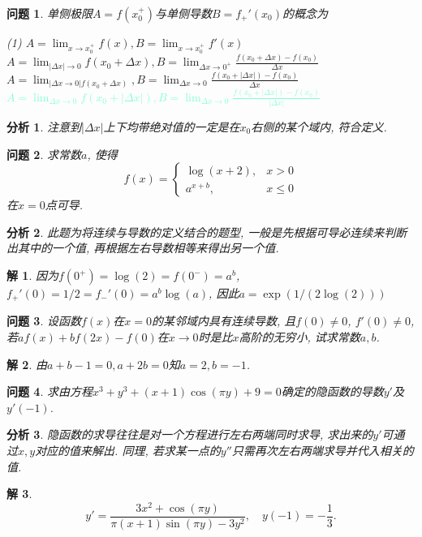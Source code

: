 \documentclass[a4paper, 12pt]{ctexart}
\theoremstyle{plain}
\newtheorem{problem}{问题}
\theoremstyle{nonumberplain}
\newtheorem{solution}{解}
\newtheorem{analysis}{分析}
\newcommand{\ans}[1]{\textcolor{Aquamarine}{#1}}
\newcommand{\lr}[3]{\left#1#3\right#2}
\begin{document}
\begin{problem}
    单侧极限$A=f(x_0^+)$与单侧导数$B=f_+'(x_0)$的概念为
    \begin{tasks}(1)
        \task $A = \lim_{x\to x_0^+}f(x), B = \lim_{x\to x_0^+}f'(x)$
        \task $A = \lim_{\lr\vert\vert{\Delta x}\to 0}f(x_0+\Delta x), B = \lim_{\Delta x\to 0^+}\frac{f(x_0 + \Delta x) - f(x_0)}{\Delta x}$
        \task $A = \lim_{\lr\vert\vert{\Delta x \to 0}f(x_0 + \Delta x)}, B = \lim_{\Delta x \to 0}\frac{f(x_0 + \lr\vert\vert{\Delta x})-f(x_0)}{\Delta x}$
        \task[\ans{(D)}] \ans{$A = \lim_{\Delta x\to 0}f(x_0 + \lr\vert\vert{\Delta x}), B = \lim_{\Delta x \to 0}\frac{f(x_0 + \lr\vert\vert{\Delta x})- f(x_0)}{\lr\vert\vert{\Delta x}}$}
    \end{tasks}
\end{problem}
\begin{analysis}
    注意到$\lr\vert\vert{\Delta x}$上下均带绝对值的一定是在$x_0$右侧的某个域内, 符合定义.
\end{analysis}

\begin{problem}
    求常数$a$, 使得
    \begin{equation}
        f(x) =
        \begin{cases}
            \log(x+2),&x>0\\
            a^{x+b},&x\leq 0
        \end{cases}
    \end{equation}
    在$x=0$点可导.
\end{problem}
\begin{analysis}
    此题为将连续与导数的定义结合的题型, 一般是先根据可导必连续来判断出其中的一个值, 再根据左右导数相等来得出另一个值.
\end{analysis}
\begin{solution}
    因为$f(0^+)=\log(2)=f(0^-)=a^b$, $f_+'(0)=1/2=f_-'(0)=a^b\log(a)$, 因此$a = \exp(1/(2\log(2)))$
\end{solution}

\begin{problem}
    设函数$f(x)$在$x=0$的某邻域内具有连续导数, 且$f(0)\neq 0$, $f'(0)\neq 0$, 若$af(x) + bf(2x)-f(0)$在$x\to 0$时是比$x$高阶的无穷小, 试求常数$a, b$.
\end{problem}
\begin{solution}
    由$a+b-1=0, a+2b=0$知$a=2, b=-1$.
\end{solution}

\begin{problem}
    求由方程$x^3+y^3+(x+1)\cos(\pi y)+9=0$确定的隐函数的导数$y'$及$y'(-1)$.
\end{problem}
\begin{analysis}
    隐函数的求导往往是对一个方程进行左右两端同时求导, 求出来的$y'$可通过$x, y$对应的值来解出. 同理, 若求某一点的$y''$只需再次左右两端求导并代入相关的值.
\end{analysis}
\begin{solution}
    \begin{equation}
        y'= \frac{3x^2+\cos(\pi y)}{\pi(x+1)\sin(\pi y)-3y^2},\quad y(-1)=-\frac{1}{3}.
    \end{equation}
\end{solution}
\end{document}
